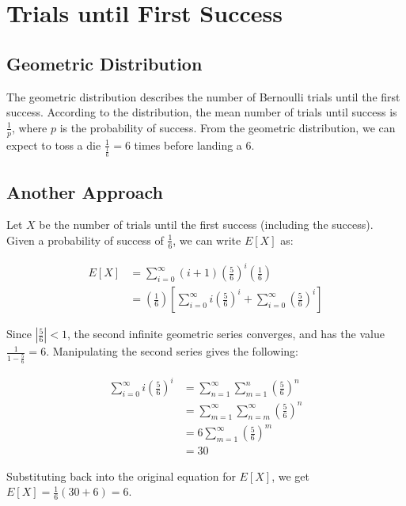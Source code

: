 \documentclass{article}
\date{}
\title{}
\author{Kaan Aksoy | Feb 10, 2020}
\begin{document}
\maketitle

\section{Trials until First Success}
\subsection{Geometric Distribution}
The geometric distribution describes the number of 
Bernoulli trials until the first success. According to the 
distribution, the mean number of trials until success is 
$ \frac{1}{p}$, where $p$ is the probability of success. 
From the geometric distribution, we can expect to toss a 
die $\frac{1}{\frac{1}{6}} = 6$ times before landing a $6$.

\subsection{Another Approach}

Let $X$ be the number of trials until the first success (including the success). Given a probability of 
success of $\frac{1}{6}$, we can write $E[X]$ as:

\begin{equation*}
\begin{split}
E[X] &=  \sum_{i=0}^{\infty} (i + 1)\left( \frac{5}{6} \right)^i \left( \frac{1}{6} \right) \\
&= \left( \frac{1}{6} \right) \left[ \sum_{i=0}^{\infty} i\left( \frac{5}{6} \right)^i +  \sum_{i=0}^{\infty} \left( \frac{5}{6} \right)^i \right]
\end{split}
\end{equation*}

Since $|\frac{5}{6}| < 1$, the second infinite geometric series converges, and has 
the value $\frac{1}{1 - \frac{5}{6}} = 6$. Manipulating the second series gives the 
following:

\begin{equation*}
\begin{split}
\sum_{i=0}^{\infty} i\left( \frac{5}{6} \right)^i &=
\sum_{n=1}^{\infty} \sum_{m=1}^{n} \left( \frac{5}{6} \right)^n \\ &= 
\sum_{m=1}^{\infty} \sum_{n=m}^{\infty} \left( \frac{5}{6} \right)^n \\ &= 
6 \sum_{m=1}^{\infty} \left( \frac{5}{6} \right)^m \\ &= 30
\end{split}
\end{equation*}

Substituting back into the original equation for $E[X]$, we get $E[X] = \frac{1}{6} \left( 30 + 6 \right) = 6$.
\end{document}
